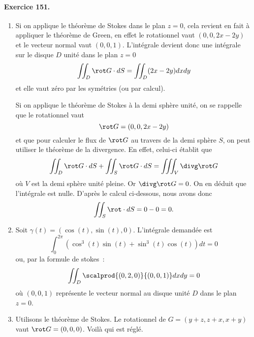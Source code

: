 \paragraph{Exercice 151.}
\begin{enumerate}

\item Si on applique le théorème de Stokes dans le plan $z = 0$, cela revient en fait à appliquer le théorème de Green, en effet le rotationnel vaut $(0, 0, 2 x - 2 y)$ et le vecteur normal vaut $(0,0,1)$. L'intégrale devient donc une intégrale sur le disque $D$ unité dans le plan $z = 0$
\begin{equation*}
\iint_D \rot G \cdot d S = \iint_D (2x - 2 y) d x d y
\end{equation*}
et elle vaut zéro par les symétries (ou par calcul).

Si on applique le théorème de Stokes à la demi sphère unité, on se rappelle que le rotationnel vaut
\begin{equation*}
\rot G = (0, 0, 2x - 2 y)
\end{equation*}
et que pour calculer le flux de $\rot G$ au travers de la demi sphère $S$, on peut utiliser le théorème de la divergence. En effet, celui-ci établit que
\begin{equation*}
\iint_D \rot G \cdot d S + \iint_S \rot G \cdot d S = \iiint_V
\divg \rot G
\end{equation*}
où $V$ est la demi sphère unité pleine. Or $\divg \rot G = 0$. On en
déduit que l'intégrale est nulle. D'après le calcul ci-dessous, nous
avons donc
\begin{equation*}
\iint_S \rot \cdot d S = 0 - 0 = 0.
\end{equation*}

\item Soit $\gamma(t) = (\cos(t), \sin(t), 0)$. L'intégrale demandée
est
\begin{equation*}
\int_0^{2\pi} (\cos^3(t) \sin(t) + \sin^3(t) \cos(t)) d t = 0
\end{equation*}
ou, par la formule de stokes~:
\begin{equation*}
\iint_D \scalprod{(0,2,0)}{(0,0,1)} d x d y = 0
\end{equation*}
où $(0,0,1)$ représente le vecteur normal au disque unité $D$ dans
le plan $z = 0$.

\item Utilisons le théorème de Stokes. Le rotationnel de $G =
(y+z,z+x,x+y)$ vaut $\rot G = (0,0,0)$. Voilà qui est réglé.


\end{enumerate}
